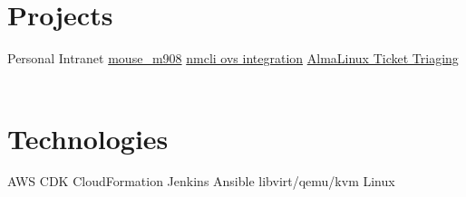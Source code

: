 \documentclass[]{friggeri-cv}
\begin{document}
\begin{aside}
  \section{Projects}
    \bullet\hspace{0.2cm}Personal Intranet
    \bullet\hspace{0.2cm}\href{https://github.com/dokutan/mouse_m908/pull/12}{mouse\_m908}
    \bullet\hspace{0.2cm}\href{https://gitlab.freedesktop.org/NetworkManager/NetworkManager/-/merge_requests/679}{nmcli ovs integration}
    \bullet\hspace{0.2cm}\href{https://bugs.almalinux.org/view.php?id=151}{AlmaLinux Ticket Triaging}
    ~
  \section{Technologies}
    \bullet\hspace{0.2cm}AWS CDK
    \bullet\hspace{0.2cm}CloudFormation
    \bullet\hspace{0.2cm}Jenkins
    \bullet\hspace{0.2cm}Ansible
    \bullet\hspace{0.2cm}libvirt/qemu/kvm
    \bullet\hspace{0.2cm}Linux
    ~
\end{aside}
\end{document}
